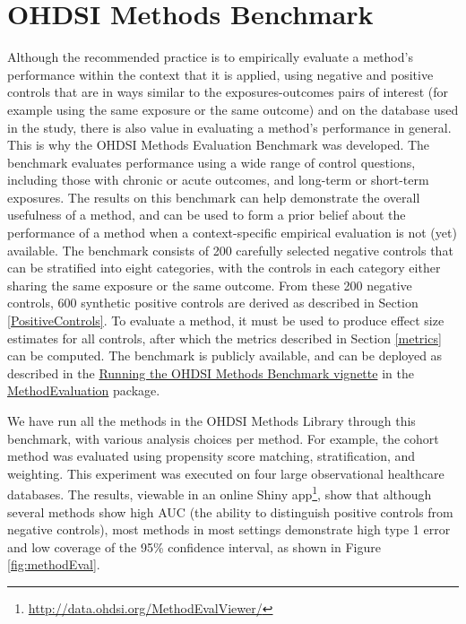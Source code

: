 \documentclass[11pt]{book}
\let\rmarkdownfootnote\footnote%
\def\footnote{\protect\rmarkdownfootnote}
\theoremstyle{definition}
\theoremstyle{definition}
\theoremstyle{definition}
\theoremstyle{remark}
\begin{document}
\hypertarget{ohdsi-methods-benchmark}{%
\section{OHDSI Methods Benchmark}\label{ohdsi-methods-benchmark}}

Although the recommended practice is to empirically evaluate a method's performance within the context that it is applied, using negative and positive controls that are in ways similar to the exposures-outcomes pairs of interest (for example using the same exposure or the same outcome) and on the database used in the study, there is also value in evaluating a method's performance in general. This is why the OHDSI Methods Evaluation Benchmark was developed. The benchmark evaluates performance using a wide range of control questions, including those with chronic or acute outcomes, and long-term or short-term exposures. The results on this benchmark can help demonstrate the overall usefulness of a method, and can be used to form a prior belief about the performance of a method when a context-specific empirical evaluation is not (yet) available. The benchmark consists of 200 carefully selected negative controls that can be stratified into eight categories, with the controls in each category either sharing the same exposure or the same outcome. From these 200 negative controls, 600 synthetic positive controls are derived as described in Section \ref{PositiveControls}. To evaluate a method, it must be used to produce effect size estimates for all controls, after which the metrics described in Section \ref{metrics} can be computed. The benchmark is publicly available, and can be deployed as described in the \href{https://ohdsi.github.io/MethodEvaluation/articles/OhdsiMethodsBenchmark.html}{Running the OHDSI Methods Benchmark vignette} in the \href{https://ohdsi.github.io/MethodEvaluation/}{MethodEvaluation} package.

We have run all the methods in the OHDSI Methods Library through this benchmark, with various analysis choices per method. For example, the cohort method was evaluated using propensity score matching, stratification, and weighting. This experiment was executed on four large observational healthcare databases. The results, viewable in an online Shiny app\footnote{\url{http://data.ohdsi.org/MethodEvalViewer/}}, show that although several methods show high AUC (the ability to distinguish positive controls from negative controls), most methods in most settings demonstrate high type 1 error and low coverage of the 95\% confidence interval, as shown in Figure \ref{fig:methodEval}.
\end{document}
